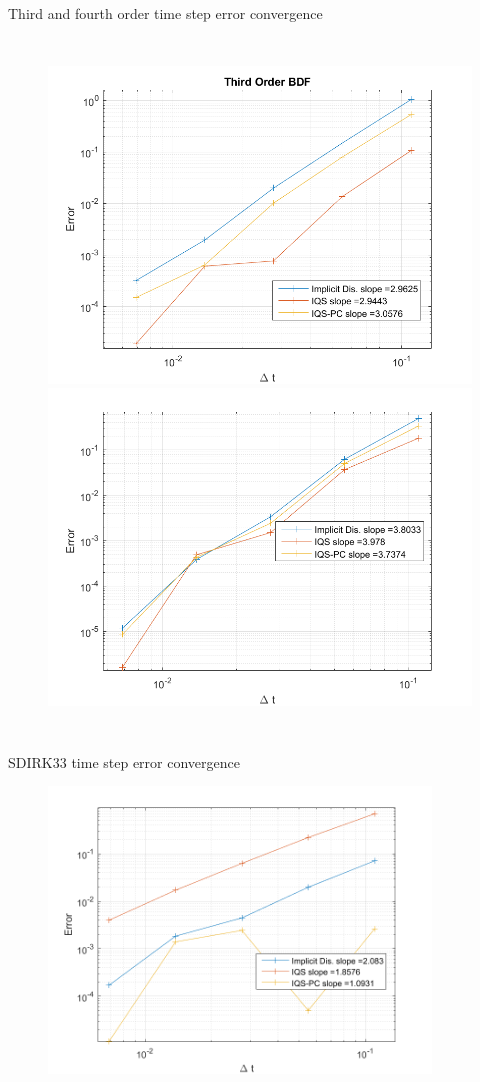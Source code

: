 \documentclass[8pt,xcolor=dvipnames]{beamer}
\begin{document}
\begin{frame}{Third and fourth order time step error convergence}

\begin{columns}
\column{\dimexpr\paperwidth-10pt}
\begin{figure}
\includegraphics[width=0.5\linewidth]{figures/1D_conv_BDF3.png}
\includegraphics[width=0.5\linewidth]{figures/1D_conv_BDF4.png}
\end{figure}
\end{columns}

\end{frame}

\begin{frame}{SDIRK33 time step error convergence}

\begin{figure}
\includegraphics[width=\linewidth,height=3in,keepaspectratio]{figures/1D_conv_SDIRK33.png}
\end{figure}

\end{frame}
\end{document}
